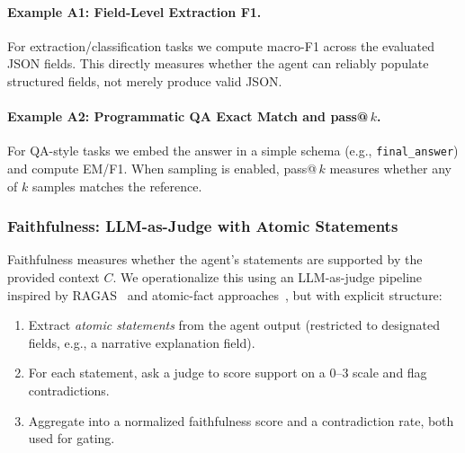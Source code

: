 \documentclass[11pt]{article}
\begin{document}
\paragraph{Example A1: Field-Level Extraction F1.}
For extraction/classification tasks we compute macro-F1 across the evaluated JSON fields.
This directly measures whether the agent can reliably populate structured fields, not merely produce valid JSON.

\paragraph{Example A2: Programmatic QA Exact Match and pass@\,$k$.}
For QA-style tasks we embed the answer in a simple schema (e.g., \texttt{final\_answer}) and compute EM/F1.
When sampling is enabled, pass@\,$k$ measures whether any of $k$ samples matches the reference.

\subsubsection{Faithfulness: LLM-as-Judge with Atomic Statements}

Faithfulness measures whether the agent’s statements are supported by the provided context $C$.
We operationalize this using an LLM-as-judge pipeline inspired by RAGAS~\citep{es2023ragas} and atomic-fact approaches~\citep{atomicFacts2024}, but with explicit structure:

\begin{enumerate}[leftmargin=12pt]
    \item Extract \emph{atomic statements} from the agent output (restricted to designated fields, e.g., a narrative explanation field).
    \item For each statement, ask a judge to score support on a 0--3 scale and flag contradictions.
    \item Aggregate into a normalized faithfulness score and a contradiction rate, both used for gating.
\end{enumerate}
\end{document}
